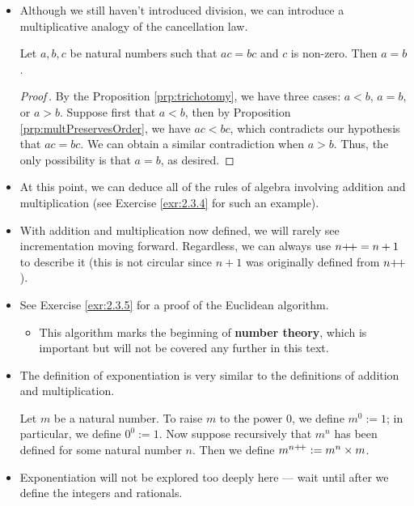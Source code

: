 \documentclass[../main.tex]{subfiles}
\begin{document}
\begin{itemize}
    \begin{prp}\label{prp:multPreservesOrder}
        If $a,b$ are natural numbers such that $a<b$, and $c$ is positive, then $ac<bc$.
        \begin{proof}
            Since $a<b$, we have $b=a+d$ for some positive $d$. Multiplying by $c$ and using the distributive law, we obtain $bc=ac+dc$. Since $c,d$ are positive, $dc$ is positive, and hence $ac<bc$ as desired.
        \end{proof}
    \end{prp}
    \item Although we still haven't introduced division, we can introduce a multiplicative analogy of the cancellation law.
    \begin{cly}
        Let $a,b,c$ be natural numbers such that $ac=bc$ and $c$ is non-zero. Then $a=b$.
        \begin{proof}[Proof\,\footnotemark]
            By the Proposition \ref{prp:trichotomy}, we have three cases: $a<b$, $a=b$, or $a>b$. Suppose first that $a<b$, then by Proposition \ref{prp:multPreservesOrder}, we have $ac<bc$, which contradicts our hypothesis that $ac=bc$. We can obtain a similar contradiction when $a>b$. Thus, the only possibility is that $a=b$, as desired.
        \end{proof}
    \end{cly}
    \item At this point, we can deduce all of the rules of algebra involving addition and multiplication (see Exercise \ref{exr:2.3.4} for such an example).
    \item With addition and multiplication now defined, we will rarely see incrementation moving forward. Regardless, we can always use $n{+\!+}=n+1$ to describe it (this is not circular since $n+1$ was originally defined from $n{+\!+}$).
    \item See Exercise \ref{exr:2.3.5} for a proof of the Euclidean algorithm.
    \begin{itemize}
        \item This algorithm marks the beginning of \textbf{number theory}, which is important but will not be covered any further in this text.
    \end{itemize}
    \item The definition of exponentiation is very similar to the definitions of addition and multiplication.
    \begin{dfn}\label{dfn:exponentiation}
        Let $m$ be a natural number. To raise $m$ to the power 0, we define $m^0:=1$; in particular, we define $0^0:=1$. Now suppose recursively that $m^n$ has been defined for some natural number $n$. Then we define $m^{n{+\!+}}:=m^n\times m$.
    \end{dfn}
    \item Exponentiation will not be explored too deeply here --- wait until after we define the integers and rationals.
\end{itemize}
\end{document}
